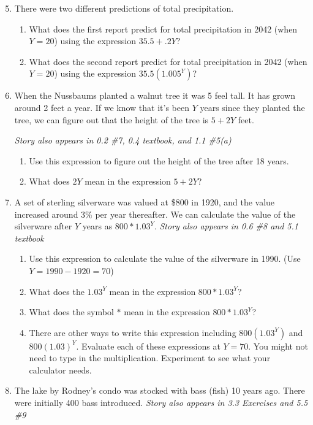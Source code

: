 \begin{enumerate} 
\setcounter{enumi}{4}

\item There were two different predictions of total precipitation.
\begin{enumerate}
\item What does the first report predict for total precipitation in 2042 (when $Y=20$) using the expression $35.5 + .2Y$?
\item What does the second report predict for total precipitation in 2042 (when $Y=20$) using the expression $35.5(1.005^Y)$?
\end{enumerate}


\item When the Nussbaums planted a walnut tree it was 5 feel tall. It has grown around 2 feet a year. If we know that it's been $Y$ years since they planted the tree, we can figure out that the height of the tree is $5+2Y$ feet.
 
 \hfill \emph{Story also appears in 0.2 \#7, 0.4 textbook, and 1.1 \#5(a)}  
\begin{enumerate}
\item Use this expression to figure out the height of the tree after 18 years.
\item What does $2Y$ mean in the expression $5+2Y$?
\end{enumerate}

\item A set of sterling silverware was valued at \$800 in 1920, and the value increased around 3\% per year thereafter.  We can calculate the value of the silverware after $Y$ years as $800 *1.03 ^ Y$. \hfill \emph{Story also appears in 0.6 \#8 and 5.1 textbook}
\begin{enumerate}
\item Use this expression to calculate the value of the silverware in 1990.  (Use $Y = 1990-1920 = 70$)
\item What does the $1.03^Y$ mean in the expression $800 *1.03 ^ Y$?
\item What does the symbol $*$ mean in the expression $800 *1.03 ^ Y$?
\item There are other ways to write this expression including $800 (1.03 ^ Y)$ and $800 (1.03) ^ Y$.  Evaluate each of these expressions at $Y=70$. You might not need to type in the multiplication.  Experiment to see what your calculator needs.
\end{enumerate}

\item The lake by Rodney's condo was stocked with bass (fish) 10 years ago.  There were initially 400 bass introduced.   \hfill \emph{Story also appears in 3.3 Exercises and 5.5 \#9}


\end{enumerate}
